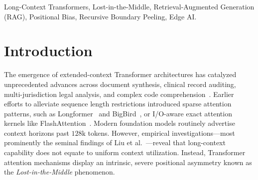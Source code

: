 \maketitle

\begin{abstract}
Extended-context Large Language Models suffer from severe positional degradation (\emph{Lost-in-the-Middle}), frequently failing needle-in-a-haystack retrieval when evidence is buried in interior text. Rather than attempting to suppress positional bias, we propose \textbf{Recursive Boundary Exposure Retrieval (\RBER{})}, an algorithmic framework that actively exploits Transformer primacy and recency attention. Grounded in layer peeling (the \emph{Burger Analogy}), \RBER{} recursively strips uninformative exterior boundaries via geometric tri-partitioning, promoting buried interior content into high-attention boundary views. Paired with chunk-level max-pooling semantic scoring and deterministic screening, \RBER{} guarantees logarithmic $\mathcal{O}(\log_3 N)$ convergence. Evaluated on an adversarial 21,408-word benchmark, \RBER{} achieves \textbf{100.0\% Exact Match retrieval} where vanilla 128k LLMs fail ($0.0\%$), cutting evaluated tokens by \textbf{88.8\%}. Code and datasets are open-sourced under the MIT license.
\end{abstract}

\begin{IEEEkeywords}
Long-Context Transformers, Lost-in-the-Middle, Retrieval-Augmented Generation (RAG), Positional Bias, Recursive Boundary Peeling, Edge AI.
\end{IEEEkeywords}

\section{Introduction}
\label{sec:intro}

The emergence of extended-context Transformer architectures has catalyzed unprecedented advances across document synthesis, clinical record auditing, multi-jurisdiction legal analysis, and complex code comprehension~\cite{vaswani2017attention,dubey2024llama3,xiong2023effective}. Earlier efforts to alleviate sequence length restrictions introduced sparse attention patterns, such as Longformer~\cite{beltagy2020longformer} and BigBird~\cite{zaheer2020bigbird}, or I/O-aware exact attention kernels like FlashAttention~\cite{dao2022flashattention}. Modern foundation models routinely advertise context horizons past $128\text{k}$ tokens. However, empirical investigations---most prominently the seminal findings of Liu et al.~\cite{liu2023lost}---reveal that long-context capability does not equate to uniform context utilization. Instead, Transformer attention mechanisms display an intrinsic, severe positional asymmetry known as the \emph{Lost-in-the-Middle} phenomenon.

